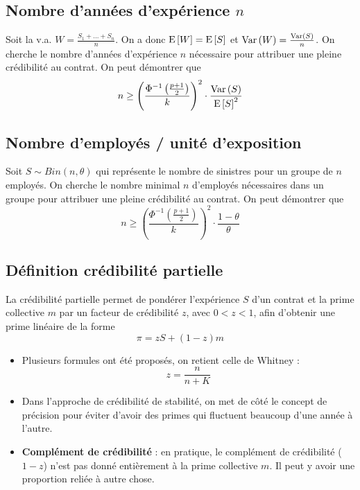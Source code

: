 \documentclass[10pt, french]{article}
\begin{document}
\begin{multicols*}{3}
\subsection*{Nombre d'années d'expérience $n$}
Soit la v.a. $W = \frac{S_1 + ... + S_n}{n}$. On a donc $\mathrm{E} \left[ W \right] = \mathrm{E} \left[ S \right]$ et $\mathrm{Var} \left( W \right) = \frac{\mathrm{Var} \left( S \right)}{n}$. On cherche le nombre d'années d'expérience $n$ nécessaire pour attribuer une pleine crédibilité au contrat. On peut démontrer que
\begin{equation}
n \geq \left( \frac{\Phi^{-1}\left(\frac{p+1}{2} \right)}{k} \right)^2 \cdot \frac{\mathrm{Var} \left( S \right)}{\mathrm{E} \left[ S \right]^2}
\end{equation}

\subsection*{Nombre d'employés / unité d'exposition}
Soit $S \sim Bin(n, \theta)$ qui représente le nombre de sinistres pour un groupe de $n$ employés. On cherche le nombre minimal $n$ d'employés nécessaires dans un groupe pour attribuer une pleine crédibilité au contrat. On peut démontrer que
\begin{equation}
n \geq \left( \frac{\Phi^{-1}\left(\frac{p+1}{2} \right)}{k} \right)^2 \cdot \frac{1 - \theta}{\theta}
\end{equation}

\subsection*{Définition crédibilité partielle}
\begin{definition}
La crédibilité partielle permet de pondérer l'expérience $S$ d'un contrat et la prime collective $m$ par un facteur de crédibilité $z$, avec $0 < z < 1$, afin d'obtenir une prime linéaire de la forme
\[\pi = z S + (1-z) m\]
\end{definition}
\begin{itemize}
\item Plusieurs formules ont été proposés, on retient celle de Whitney : 
\begin{equation}
z = \frac{n}{n+K}
\end{equation}
\item Dans l'approche de crédibilité de stabilité, on met de côté le concept de précision pour éviter d'avoir des primes qui fluctuent beaucoup d'une année à l'autre.
\item \textbf{Complément de crédibilité} : en pratique, le complément de crédibilité ($1-z$) n'est pas donné entièrement à la prime collective $m$. Il peut y avoir une proportion reliée à autre chose.
\end{itemize}


\end{multicols*}
\end{document}

